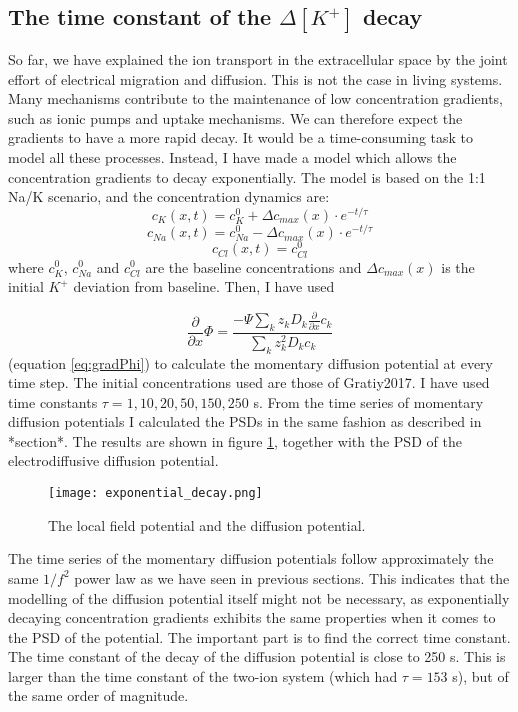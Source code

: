\documentclass{article}
\begin{document}
\subsection{The time constant of the  $\Delta [K^+]$ decay}\label{exponential decay}
So far, we have explained the ion transport in the extracellular space by the joint effort of electrical migration and diffusion. This is not the case in living systems. Many mechanisms contribute to the maintenance of low concentration gradients, such as ionic pumps and uptake mechanisms. We can therefore expect the gradients to have a more rapid decay. It would be a time-consuming task to model all these processes. Instead, I have made a model which allows the concentration gradients to decay exponentially. The model is based on the 1:1 Na/K scenario, and the concentration dynamics are:
$$
c_{K}(x,t) = c_{K}^0 +\Delta c_{max}(x) \cdot e^{-t/\tau}
$$
$$
c_{Na}(x,t) = c_{Na}^0 -\Delta c_{max}(x) \cdot e^{-t/\tau}
$$
$$
c_{Cl}(x,t) = c_{Cl}^0
$$
where $c_{K}^0$, $c_{Na}^0$ and $c_{Cl}^0$ are the baseline concentrations and $\Delta c_{max} (x)$ is the initial $K^+$ deviation from baseline.  Then, I have used 


\begin{equation*}
\frac{\partial}{\partial x} \Phi = \frac{-\Psi \sum_k z_k D_k \frac{\partial}{\partial x} c_k}{\sum_k z_k^2 D_k c_k}
\end{equation*}
(equation \ref{eq:gradPhi}) to calculate the momentary diffusion potential at every time step. The initial concentrations used are those of Gratiy2017. I have used time constants $\tau = 1,10,20,50, 150, 250$ s. From the time series of momentary diffusion potentials I calculated the PSDs in the same fashion as described in *section*. The results are shown in figure \ref{fig:exponential_decay}, together with the PSD of the electrodiffusive diffusion potential. 

\begin{figure}
  \texttt{[image: exponential\_decay.png]}
  \caption{The local field potential and the diffusion potential. }
  \label{fig:exponential_decay}
\end{figure}

The time series of the momentary diffusion potentials follow approximately the same $1/f^2$ power law as we have seen in previous sections. This indicates that the modelling of the diffusion potential itself might not be necessary, as exponentially decaying concentration gradients exhibits the same properties when it comes to the PSD of the potential. The important part is to find the correct time constant. The time constant of the decay of the diffusion potential is close to 250 s. This is larger than the time constant of the two-ion system (which had $\tau = 153$ s), but of the same order of magnitude.
\end{document}
